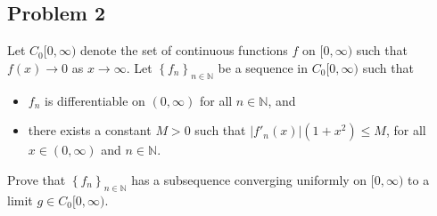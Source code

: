 \documentclass[12pt]{article}
\newcommand{\n}{\mathbb{N}}
\newcommand\setb[1]{\left \{ #1 \right \}}
\newcommand{\abs}[1]{\left | #1 \right |}
\theoremstyle{definition}
\begin{document}
\subsection{Problem 2 \texorpdfstring{\cite{Melody}}{}}
Let $C_0[0,\infty)$ denote the set of continuous functions $f$ on $[0,\infty)$ such that $f(x) \to 0$ as $x \to \infty$. Let $\setb{ f_n }_{n \in \n}$ be a sequence in $C_0[0,\infty)$ such that 
\begin{itemize}
    \item $f_n$ is differentiable on $(0,\infty)$ for all $n \in \n$, and 
    \item there exists a constant $M > 0$ such that $\abs{ f'_n(x) }(1 + x^2) \leq M$, for all $x \in (0,\infty)$ and $n \in \n$.
\end{itemize}
Prove that $\setb{ f_n }_{n \in \n}$ has a subsequence converging uniformly on $[0,\infty)$ to a limit $g \in C_0[0,\infty)$.
\end{document}
